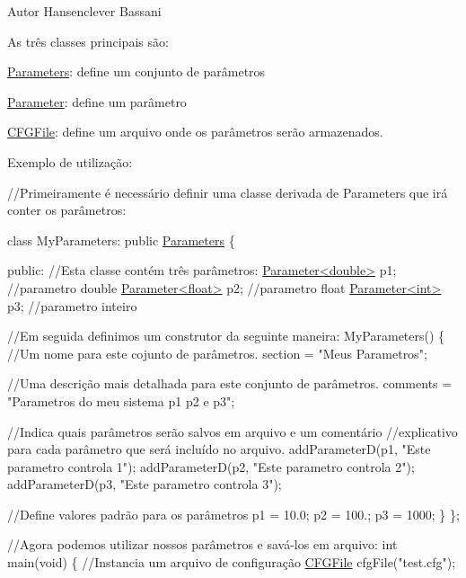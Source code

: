 \begin{DoxyAuthor}{Autor}
Hansenclever Bassani
\end{DoxyAuthor}
As três classes principais são\-:

\hyperlink{class_parameters}{Parameters}\-: define um conjunto de parâmetros

\hyperlink{class_parameter}{Parameter}\-: define um parâmetro

\hyperlink{class_c_f_g_file}{C\-F\-G\-File}\-: define um arquivo onde os parâmetros serão armazenados.

Exemplo de utilização\-: 
\begin{DoxyCode}
\textcolor{comment}{//Primeiramente é necessário definir uma classe derivada de Parameters que irá conter os parâmetros:}
 
\textcolor{keyword}{class }MyParameters: \textcolor{keyword}{public} \hyperlink{class_parameters}{Parameters} \{

\textcolor{keyword}{public}:
     \textcolor{comment}{//Esta classe contém três parâmetros:}
     \hyperlink{class_parameter}{Parameter<double>} p1; \textcolor{comment}{//parametro double}
     \hyperlink{class_parameter}{Parameter<float>} p2;  \textcolor{comment}{//parametro float}
     \hyperlink{class_parameter}{Parameter<int>} p3;    \textcolor{comment}{//parametro inteiro}

     \textcolor{comment}{//Em seguida definimos um construtor da seguinte maneira:}
     MyParameters() \{
         \textcolor{comment}{//Um nome para este cojunto de parâmetros.}
         section = \textcolor{stringliteral}{"Meus Parametros"};

         \textcolor{comment}{//Uma descrição mais detalhada para este conjunto de parâmetros.}
         comments = \textcolor{stringliteral}{"Parametros do meu sistema p1 p2 e p3"};

         \textcolor{comment}{//Indica quais parâmetros serão salvos em arquivo e um comentário }
         \textcolor{comment}{//explicativo para cada parâmetro que será incluído no arquivo.}
         addParameterD(p1, \textcolor{stringliteral}{"Este parametro controla 1"});
         addParameterD(p2, \textcolor{stringliteral}{"Este parametro controla 2"});
         addParameterD(p3, \textcolor{stringliteral}{"Este parametro controla 3"});

         \textcolor{comment}{//Define valores padrão para os parâmetros}
         p1 = 10.0;
         p2 = 100.;
         p3 = 1000;
     \}
\};

 \textcolor{comment}{//Agora podemos utilizar nossos parâmetros e savá-los em arquivo:}
 \textcolor{keywordtype}{int} main(\textcolor{keywordtype}{void})
 \{
     \textcolor{comment}{//Instancia um arquivo de configuração}
     \hyperlink{class_c_f_g_file}{CFGFile} cfgFile(\textcolor{stringliteral}{"test.cfg"});


\end{DoxyCode}

